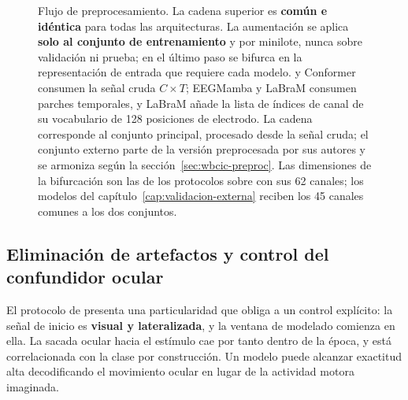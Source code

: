 \begin{figure}[H]
\caption{Flujo de preprocesamiento. La cadena superior es \textbf{común e idéntica}
para todas las arquitecturas. La aumentación se aplica \textbf{solo al conjunto de
entrenamiento} y por minilote, nunca sobre validación ni prueba; en el último paso se bifurca en la representación de
entrada que requiere cada modelo. \eegnet{} y Conformer consumen la señal cruda
$C\times T$; EEGMamba y LaBraM consumen parches temporales, y LaBraM añade la lista
de índices de canal de su vocabulario de 128 posiciones de electrodo. La cadena corresponde al conjunto principal,
procesado desde la señal cruda; el conjunto externo parte de la versión preprocesada por
sus autores y se armoniza según la sección~\ref{sec:wbcic-preproc}. Las dimensiones de la
bifurcación son las de los protocolos sobre \openbmi{} con sus 62 canales; los modelos del
capítulo~\ref{cap:validacion-externa} reciben los 45 canales comunes a los dos conjuntos.}
\label{fig:pipeline}
\end{figure}

\subsection{Eliminación de artefactos y control del confundidor ocular}
\label{sec:artefactos}

El protocolo de \openbmi{} presenta una particularidad que obliga a un control
explícito: la señal de inicio es \textbf{visual y lateralizada}, y la ventana de
modelado comienza en ella. La sacada ocular hacia el estímulo cae por tanto
dentro de la época, y está correlacionada con la clase por construcción. Un
modelo puede alcanzar exactitud alta decodificando el movimiento ocular en lugar
de la actividad motora imaginada.

